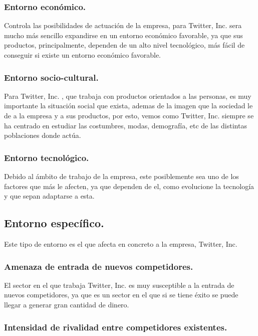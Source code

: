 \subsubsection{Entorno económico.}

Controla las posibilidades de actuación de la empresa, para Twitter, Inc. sera mucho más sencillo expandirse en un entorno económico favorable, ya que sus productos, principalmente, dependen de un alto nivel tecnológico, más fácil de conseguir si existe un entorno económico favorable.

\subsubsection{Entorno socio-cultural.}

Para Twitter, Inc. , que trabaja con productos orientados a las personas, es muy importante la situación social que exista, ademas de la imagen que la sociedad le de a la empresa y a sus productos, por esto, vemos como Twitter, Inc. siempre se ha centrado en estudiar las costumbres, modas, demografía, etc de las distintas poblaciones donde actúa.

\subsubsection{Entorno tecnológico.}

Debido al ámbito de trabajo de la empresa, este posiblemente sea uno de los factores que más le afecten, ya que dependen de el, como evolucione la tecnología y que sepan adaptarse a esta.


\subsection{Entorno específico.}

Este tipo de entorno es el que afecta en concreto a la empresa, Twitter, Inc.

\subsubsection{Amenaza de entrada de nuevos competidores.}

El sector en el que trabaja Twitter, Inc. es muy susceptible a la entrada de nuevos competidores, ya que es un sector en el que si se tiene éxito se puede llegar a generar gran cantidad de dinero.

\subsubsection{Intensidad de rivalidad entre competidores existentes.}


